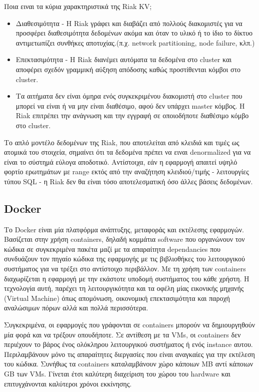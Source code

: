 \documentclass[conference]{IEEEtran}
\begin{document}
Ποια ειναι τα κύρια χαρακτηριστικά της Riak KV;
\begin{itemize}
    \item 
    Διαθεσιμότητα - H Riak γράφει και διαβάζει από πολλούς διακομιστές για να προσφέρει διαθεσιμότητα δεδομένων ακόμα και όταν το υλικό ή το ίδιο το δίκτυο αντιμετωπίζει συνθήκες αποτυχίας.(π.χ. network partitioning, node failure, κλπ.)
    
    \item 
    Επεκτασιμότητα - Η Riak διανέμει αυτόματα τα δεδομένα στο cluster και αποφέρει σχεδόν γραμμική αύξηση απόδοσης καθώς προστίθενται κόμβοι στο cluster.

    \item 
    Τα αιτήματα δεν είναι όμηρα ενός συγκεκριμένου διακομιστή στο cluster που μπορεί να είναι ή να μην είναι διαθέσιμο, αφού δεν υπάρχει master κόμβος. Η Riak επιτρέπει την ανάγνωση και την εγγραφή σε οποιοδήποτε διαθέσιμο κόμβο στο cluster.
\end{itemize}
Το απλό μοντέλο δεδομένων της Riak, που αποτελείται από κλειδιά και τιμές ως ατομικά του στοιχεία, σημαίνει ότι τα δεδομένα πρέπει να ειναι denormalized για να είναι το σύστημά εύλογα αποδοτικό. Αντίστοιχα, εάν η εφαρμογή απαιτεί υψηλό φορτίο ερωτημάτων με range εκτός από την αναζήτηση κλειδιού/τιμής - λειτουργίες τύπου SQL - η Riak δεν θα είναι τόσο αποτελεσματική όσο άλλες βάσεις δεδομένων.



\subsection{Docker}
Το Docker είναι μία πλατφόρμα ανάπτυξης, μεταφοράς και εκτέλεσης εφαρμογών. Βασίζεται στην χρήση containers, δηλαδή κομμάτια software που οργανώνουν τον κώδικα σε συγκεκριμένα πακέτα μαζί με τα απαραίτητα dependancies που συνδυάζουν τον πηγαίο κώδικα της εφαρμογής με τις βιβλιοθήκες του λειτουργικού συστήματος για να τρέξει στο αντίστοιχο περιβάλλον.  Με τη χρήση των containers διαχωρίζεται η εφαρμογή με την εκάστοτε υποδομή συστήματος του κάθε χρήστη. Η τεχνολογία αυτή, παρέχει τη λειτουργικότητα και τα οφέλη μίας εικονικής μηχανής (Virtual Machine) όπως απομόνωση, οικονομική επεκτασιμότητα και παροχή αναλώσιμων πόρων αλλά και πολλά περισσότερα.

Συγκεκριμένα, οι εφαρμογές που γράφονται σε containers μπορούν να δημιουργηθούν μία φορά και να τρέξουν οπουδήποτε. Σε αντίθεση με τα VMs, οι containers δεν περιέχουν το βάρος ένος ολόκληρου λειτουργικού συστήματος ή ενός instance αυτου. Περιλαμβάνουν μόνο τις απαραίτητες διεργασίες που είναι αναγκαίες για την εκτέλεση του κώδικα. Συνήθως τα containers καταλαμβάνουν χώρο κάποιων MB αντί κάποιων GB των VMs. Γίνεται έτσι καλύτερη διαχείριση του χώρου του hardware και επιτυγχάνονται καλύτεροι χρόνοι εκκίνησης.
\end{document}
